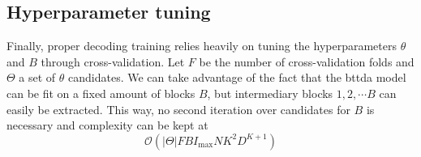 \subsection{Hyperparameter tuning}
Finally, proper decoding training relies heavily on tuning the hyperparameters
$\theta$ and $B$ through cross-validation.
Let $F$ be the number of cross-validation folds and $\Theta$ a set of $\theta$
candidates.
We can take advantage of the fact that the \ac{bttda} model can be fit on a fixed
amount of blocks $B$, but intermediary blocks $1, 2, \cdots B$ can easily be extracted.
This way, no second iteration over candidates for $B$ is necessary and complexity
can be kept at
\begin{equation}
	\mathcal{O}\left(\left|\Theta\right|FBI_\text{max}NK^2D^{K+1}\right)
\end{equation}
